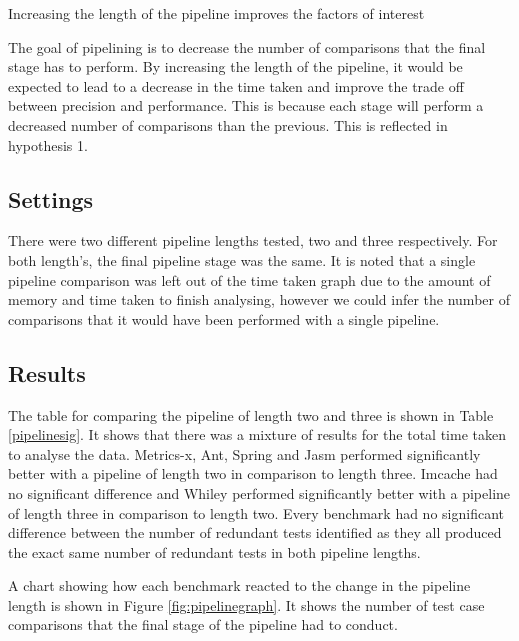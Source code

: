 \begin{hyp}
Increasing the length of the pipeline improves the factors of interest
\end{hyp}

The goal of pipelining is to decrease the number of comparisons that the final stage has to perform. By increasing the length of the pipeline, it would be expected to lead to a decrease in the time taken and improve the trade off between precision and performance. This is because each stage will perform a decreased number of comparisons than the previous. This is reflected in hypothesis 1.

\subsection{Settings}
There were two different pipeline lengths tested, two and three respectively. For both length's, the final pipeline stage was the same. It is noted that a single pipeline comparison was left out of the time taken graph due to the amount of memory and time taken to finish analysing, however we could infer the number of comparisons that it would have been performed with a single pipeline.

\subsection{Results}

The table for comparing the pipeline of length two and three is shown in Table \ref{pipelinesig}. It shows that there was a mixture of results for the total time taken to analyse the data. Metrics-x, Ant, Spring and Jasm performed significantly better with a pipeline of length two in comparison to length three. Imcache had no significant difference and Whiley performed significantly better with a pipeline of length three in comparison to length two. Every benchmark had no significant difference between the number of redundant tests identified as they all produced the exact same number of redundant tests in both pipeline lengths.

A chart showing how each benchmark reacted to the change in the pipeline length is shown in Figure \ref{fig:pipelinegraph}. It shows the number of test case comparisons that the final stage of the pipeline had to conduct.

